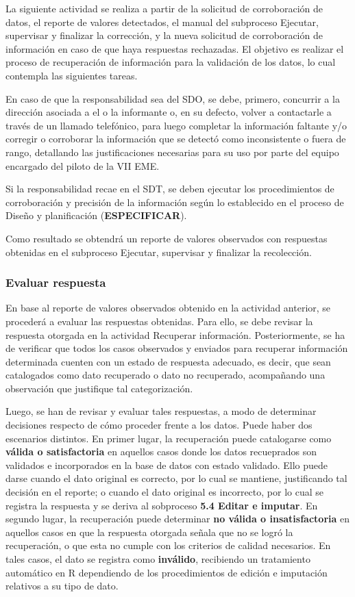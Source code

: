 \documentclass[
]{article}
\begin{document}
La siguiente actividad se realiza a partir de la solicitud de corroboración de datos, el reporte de valores detectados, el manual del subproceso Ejecutar, supervisar y finalizar la corrección, y la nueva solicitud de corroboración de información en caso de que haya respuestas rechazadas. El objetivo es realizar el proceso de recuperación de información para la validación de los datos, lo cual contempla las siguientes tareas.

En caso de que la responsabilidad sea del SDO, se debe, primero, concurrir a la dirección asociada a el o la informante o, en su defecto, volver a contactarle a través de un llamado telefónico, para luego completar la información faltante y/o corregir o corroborar la información que se detectó como inconsistente o fuera de rango, detallando las justificaciones necesarias para su uso por parte del equipo encargado del piloto de la VII EME.

Si la responsabilidad recae en el SDT, se deben ejecutar los procedimientos de corroboración y precisión de la información según lo establecido en el proceso de Diseño y planificación (\textbf{ESPECIFICAR}).

Como resultado se obtendrá un reporte de valores observados con respuestas obtenidas en el subproceso Ejecutar, supervisar y finalizar la recolección.

\hypertarget{evaluar-respuesta-1}{%
\subsubsection{Evaluar respuesta}\label{evaluar-respuesta-1}}

En base al reporte de valores observados obtenido en la actividad anterior, se procederá a evaluar las respuestas obtenidas. Para ello, se debe revisar la respuesta otorgada en la actividad Recuperar información. Posteriormente, se ha de verificar que todos los casos observados y enviados para recuperar información determinada cuenten con un estado de respuesta adecuado, es decir, que sean catalogados como dato recuperado o dato no recuperado, acompañando una observación que justifique tal categorización.

Luego, se han de revisar y evaluar tales respuestas, a modo de determinar decisiones respecto de cómo proceder frente a los datos. Puede haber dos escenarios distintos. En primer lugar, la recuperación puede catalogarse como \textbf{válida o satisfactoria} en aquellos casos donde los datos recueprados son validados e incorporados en la base de datos con estado validado. Ello puede darse cuando el dato original es correcto, por lo cual se mantiene, justificando tal decisión en el reporte; o cuando el dato original es incorrecto, por lo cual se registra la respuesta y se deriva al sobproceso \textbf{5.4 Editar e imputar}. En segundo lugar, la recuperación puede determinar \textbf{no válida o insatisfactoria} en aquellos casos en que la respuesta otorgada señala que no se logró la recuperación, o que esta no cumple con los criterios de calidad necesarios. En tales casos, el dato se registra como \textbf{inválido}, recibiendo un tratamiento automático en R dependiendo de los procedimientos de edición e imputación relativos a su tipo de dato.
\end{document}
